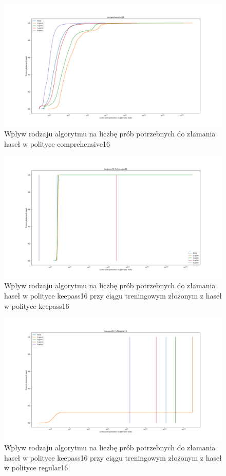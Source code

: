 \documentclass{article}
\begin{document}
	\begin{figure}[H]
		\centering
		\includegraphics[width=15cm, keepaspectratio]{comprehensive16}
		\caption{Wpływ rodzaju algorytmu na liczbę prób potrzebnych do złamania haseł w polityce comprehensive16}
	\end{figure}

	\begin{figure}[H]
		\centering
		\includegraphics[width=15cm, keepaspectratio]{keepass16_tsKeepass16}
		\caption{Wpływ rodzaju algorytmu na liczbę prób potrzebnych do złamania haseł w polityce keepass16 przy ciągu treningowym złożonym z haseł w polityce keepass16}
	\end{figure}

	\begin{figure}[H]
		\centering
		\includegraphics[width=15cm, keepaspectratio]{keepass16_tsRegular16}
		\caption{Wpływ rodzaju algorytmu na liczbę prób potrzebnych do złamania haseł w polityce keepass16 przy ciągu treningowym złożonym z haseł w polityce regular16}
	\end{figure}
\end{document}
